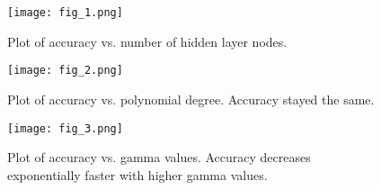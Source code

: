 \documentclass{article}
\begin{document}
	\begin{figure}[h]
		\centering
		\texttt{[image: fig\_1.png]}
		\caption{Plot of accuracy vs. number of hidden layer nodes.}
	\end{figure}
	\begin{figure}[h]
		\centering
		\texttt{[image: fig\_2.png]}
		\caption{Plot of accuracy vs. polynomial degree. Accuracy stayed the same.}
	\end{figure}
	\begin{figure}[h]
		\centering
		\texttt{[image: fig\_3.png]}
		\caption{Plot of accuracy vs. gamma values. Accuracy decreases 
		exponentially faster with higher gamma values.}
	\end{figure}
\end{document}
